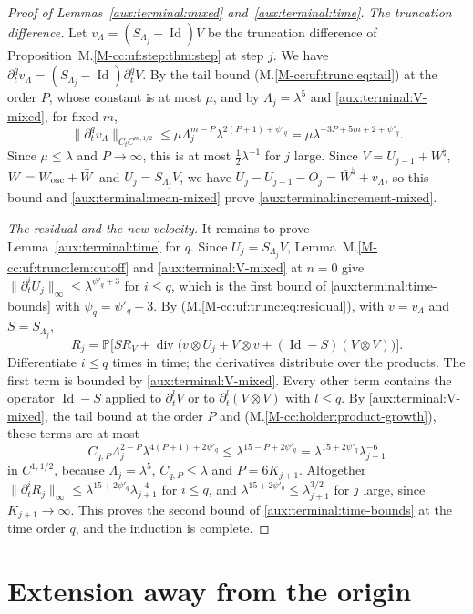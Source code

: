 \documentclass[11pt]{amsart}
\numberwithin{equation}{section}
\newcommand{\Holder}[1]{C^{#1,1/2}}
\newcommand{\Id}{\operatorname{Id}}
\newcommand{\diver}{\operatorname{div}}
\newcommand{\PP}{\mathbb P}
\begin{document}
\begin{proof}[Proof of Lemmas~\ref{aux:terminal:mixed} and~\ref{aux:terminal:time}]
\emph{The truncation difference.}
Let $v_\Lambda=(S_{\Lambda_j}-\Id)V$ be the truncation difference of
Proposition~M.\ref{M-cc:uf:step:thm:step} at step $j$.
We have $\partial_t^qv_\Lambda=(S_{\Lambda_j}-\Id)\partial_t^qV$.
By the tail bound \textup{(M.\ref{M-cc:uf:trunc:eq:tail})} at the
order $P$, whose constant is at most $\mu$, and by
$\Lambda_j=\lambda^5$ and \eqref{aux:terminal:V-mixed}, for fixed $m$,
\[
 \|\partial_t^qv_\Lambda\|_{C_t\Holder{m}}
 \le\mu\Lambda_j^{m-P}\lambda^{2(P+1)+\psi'_q}
 =\mu\lambda^{-3P+5m+2+\psi'_q}.
\]
Since $\mu\le\lambda$ and $P\to\infty$, this is at most
$\frac12\lambda^{-1}$ for $j$ large. Since $V=U_{j-1}+W^\natural$,
$W=W_{\rm osc}+\bar W$ and $U_j=S_{\Lambda_j}V$, we have
$U_j-U_{j-1}-O_j=\bar W^\natural+v_\Lambda$, so this bound and
\eqref{aux:terminal:mean-mixed} prove
\eqref{aux:terminal:increment-mixed}.

\emph{The residual and the new velocity.} It remains to prove
Lemma~\ref{aux:terminal:time} for $q$. Since $U_j=S_{\Lambda_j}V$,
Lemma~M.\ref{M-cc:uf:trunc:lem:cutoff} and
\eqref{aux:terminal:V-mixed} at $n=0$ give
$\|\partial_t^iU_j\|_\infty\le\lambda^{\psi'_q+3}$ for $i\le q$, which is
the first bound of \eqref{aux:terminal:time-bounds} with
$\psi_q=\psi'_q+3$. By
\textup{(M.\ref{M-cc:uf:trunc:eq:residual})}, with
$v=v_\Lambda$ and $S=S_{\Lambda_j}$,
\[
 R_j=\PP\bigl[SR_V
 +\diver\bigl(v\otimes U_j+V\otimes v+(\Id-S)(V\otimes V)\bigr)\bigr].
\]
Differentiate $i\le q$ times in time; the derivatives distribute over
the products. The first term is bounded by
\eqref{aux:terminal:V-mixed}. Every other term contains the operator
$\Id-S$ applied to $\partial_t^lV$ or to
$\partial_t^l(V\otimes V)$ with $l\le q$. By
\eqref{aux:terminal:V-mixed}, the tail bound at the order $P$ and
\textup{(M.\ref{M-cc:holder:product-growth})}, these
terms are at most
\[
 C_{q,P}\Lambda_j^{2-P}\lambda^{4(P+1)+2\psi'_q}
 \le\lambda^{15-P+2\psi'_q}
 =\lambda^{15+2\psi'_q}\lambda_{j+1}^{-6}
\]
in $\Holder{1}$, because $\Lambda_j=\lambda^5$,
$C_{q,P}\le\lambda$ and $P=6K_{j+1}$.
Altogether $\|\partial_t^iR_j\|_\infty
\le\lambda^{15+2\psi'_q}\lambda_{j+1}^{-4}$ for $i\le q$, and
$\lambda^{15+2\psi'_q}\le\lambda_{j+1}^{3/2}$ for $j$ large, since
$K_{j+1}\to\infty$. This proves the second bound
of \eqref{aux:terminal:time-bounds} at the time order $q$, and the
induction is complete.
\end{proof}

\section{Extension away from the origin}
\end{document}
